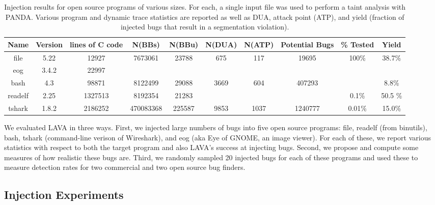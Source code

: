
\label{section:results}

\begin{table}[t!]
\centering
\begin{tabular}{c|c|c|c|c|c|c|c|c|c} 
Name    & Version & lines of C code & N(BBs)     & N(BBu)   & N(DUA)  & N(ATP) & Potential Bugs & \% Tested & Yield \\\hline
file    & 5.22    & 12927           & 7673061    & 23788    & 675     & 117    & 19695          & 100\%     & 38.7\%  \\
eog     & 3.4.2   & 22997           &            &          &         &        &                &           & \\ 
bash    & 4.3     & 98871           & 8122499    & 29088    & 3669    & 604    & 407293         &           & 8.8\% \\
readelf & 2.25    & 1327513         & 8192354    & 21283    &     &     &          & 0.1\%                  & 50.5 \% \\
tshark  & 1.8.2   & 2186252         & 470083368  & 225587   & 9853    & 1037   & 1240777        & 0.01\%    & 15.0\% \\
\end{tabular}
\caption{Injection results for open source programs of various sizes.
For each, a single input file was used to perform a taint analysis with PANDA.
Various program and dynamic trace statistics are reported as well as DUA, attack point (ATP), and yield (fraction of injected bugs that result in a segmentation violation).}
\label{table:insertion-results}
\end{table}

We evaluated LAVA in three ways.
First, we injected large numbers of bugs into five open source programs: file, readelf (from binutils), bash, tshark (command-line verison of Wireshark), and eog (aka Eye of GNOME, an image viewer).
For each of these, we report various statistics with respect to both the target program and also LAVA's success at injecting bugs.
Second, we propose and compute some measures of how realistic these bugs are.
Third, we randomly sampled 20 injected bugs for each of these programs and used these to measure detection rates for two commercial and two open source bug finders.

\subsection{Injection Experiments}

